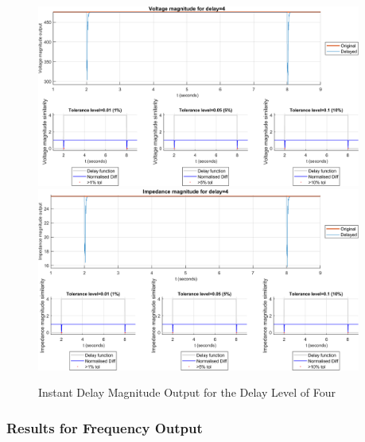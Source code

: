 \begin{figure}
    \caption{Instant Delay Magnitude Output for the Delay Level of Four}
    \includegraphics[width=0.95\textwidth]{PMUsim-figures/DelayOf_4/Instant_vMagnitude.png}    
      \includegraphics[width=0.95\textwidth]{PMUsim-figures/DelayOf_4/Instant_iMagnitude.png}         \label{fig:PMUsim_Four_Magnitude}
    \begin{small}
     \end{small}
\end{figure}

\newpage \subsubsection{Results for Frequency Output}


